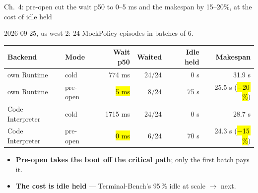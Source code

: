 \begin{frame}{Ch.\ 4: pre-open cut the wait p50 to 0--5 ms and the makespan by 15--20\%, at the cost of idle held}
{\footnotesize 2026-09-25, us-west-2: 24 MockPolicy episodes in batches of 6.\par}
\vspace{2mm}
\footnotesize
\begin{tabularx}{\textwidth}{@{}Y l r r r r@{}}
\toprule
\textbf{Backend} & \textbf{Mode} & \textbf{Wait p50} & \textbf{Waited} & \textbf{Idle held} & \textbf{Makespan}\\
\midrule
own Runtime & cold & 774 ms & 24/24 & 0 s & 31.9 s\\
own Runtime & pre-open & \hl{5 ms} & 8/24 & 75 s & 25.5 s (\hl{$-$20\,\%})\\
\midrule
Code Interpreter & cold & 1715 ms & 24/24 & 0 s & 28.7 s\\
Code Interpreter & pre-open & \hl{0 ms} & 6/24 & 70 s & 24.3 s (\hl{$-$15\,\%})\\
\bottomrule
\end{tabularx}
\par\vspace{3mm}
\begin{itemize}\footnotesize\setlength{\itemsep}{1mm}
\item \textbf{Pre-open takes the boot off the critical path}; only the first batch pays it.
\item \textbf{The cost is idle held} --- Terminal-Bench's 95\,\% idle at scale $\rightarrow$  next.
\end{itemize}
\end{frame}

